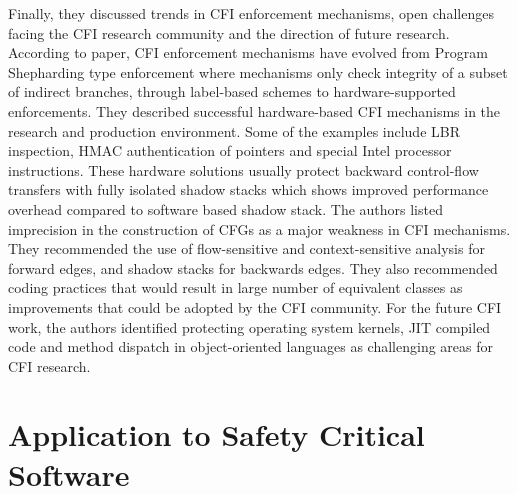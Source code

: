 \documentclass[dvips,12pt]{article}
\begin{document}
Finally, they discussed trends in CFI enforcement mechanisms, open challenges facing the CFI research community and the direction of future research. According to paper, CFI enforcement mechanisms have evolved from Program Shepharding type enforcement where mechanisms only check integrity of a subset of indirect branches, through label-based schemes to hardware-supported enforcements. They described successful hardware-based CFI mechanisms in the research and production environment. Some of the examples include LBR inspection, HMAC authentication of pointers and special Intel processor instructions. These hardware solutions usually protect backward control-flow transfers with fully isolated shadow stacks which shows improved performance overhead compared to software based shadow stack. The authors listed imprecision in the construction of CFGs as a major weakness in CFI mechanisms. They recommended the use of flow-sensitive and context-sensitive analysis for forward edges, and shadow stacks for backwards edges. They also recommended coding practices that would result in large number of equivalent classes as improvements that could be adopted by the CFI community.     For the future CFI work, the authors identified protecting operating system kernels, JIT compiled code and method dispatch in object-oriented languages as challenging areas for CFI research.

\section{Application to Safety Critical Software}










 





\end{document}
